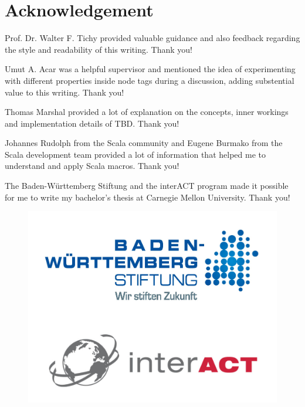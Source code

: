 \documentclass{thesisclass}
\begin{document}

\frontmatter
{}



\chapter*{Acknowledgement}

Prof. Dr. Walter F. Tichy provided valuable guidance and also feedback regarding the style and readability of this writing. Thank you!

Umut A. Acar was a helpful supervisor and mentioned the idea of experimenting with different properties inside node tags during a discussion, adding substential value to this writing. Thank you!

Thomas Marshal provided a lot of explanation on the concepts, inner workings and implementation details of TBD. Thank you!

Johannes Rudolph from the Scala community and Eugene Burmako from the Scala development team provided a lot of information that helped me to understand and apply Scala macros. Thank you!

The Baden-W\"urttemberg Stiftung and the interACT program made it possible for me to write my bachelor's thesis at Carnegie Mellon University. Thank you!

\begin{figure}
\centering
\includegraphics[scale=2]{logos/BW.jpg}
\end{figure}
\end{document}
